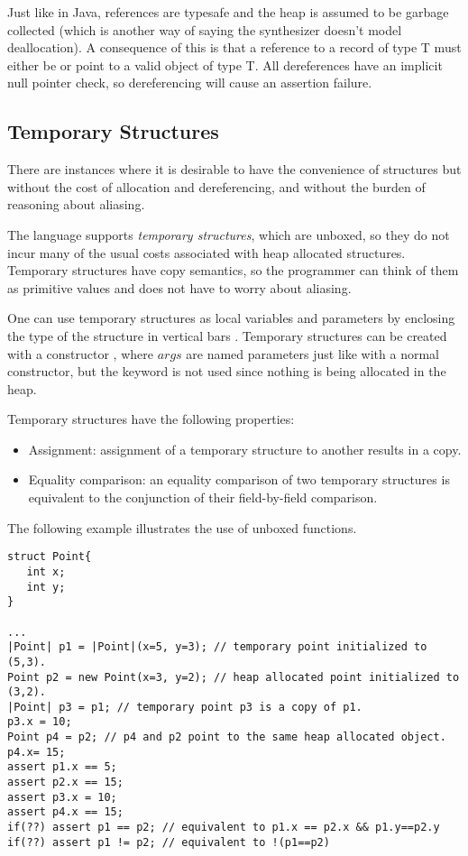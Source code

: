 Just like in Java, references are typesafe and the heap is assumed to be garbage collected (which is another way of saying the synthesizer doesn't model deallocation). A consequence of this is that a reference to a record of type T must either be  or point to a valid object of type T. All dereferences have an implicit null pointer check, so dereferencing  will cause an assertion failure.

\subsection{Temporary Structures}

There are instances where it is desirable to have the convenience of structures but without the cost of allocation and dereferencing, and without the burden of reasoning about aliasing. 

The language supports \emph{temporary structures}, which are unboxed, so they do not incur many of the usual costs associated with heap allocated structures. Temporary structures have copy semantics, so the programmer can think of them as primitive values and does not have to worry about aliasing. 

One can use temporary structures as local variables and parameters by enclosing the type of the structure in vertical bars . Temporary structures can be created with a constructor , where $args$ are named parameters just like with a normal constructor, but the keyword  is not used since nothing is being allocated in the heap. 

Temporary structures have the following properties:
\begin{itemize}
\item Assignment: assignment of a temporary structure to another results in a copy. 
\item Equality comparison: an equality comparison of two temporary structures is equivalent to the conjunction of their field-by-field comparison.
\end{itemize}

The following example illustrates the use of unboxed functions.

\begin{Example}
\begin{lstlisting}
struct Point{
   int x;
   int y;
}

...
|Point| p1 = |Point|(x=5, y=3); // temporary point initialized to (5,3).
Point p2 = new Point(x=3, y=2); // heap allocated point initialized to (3,2).
|Point| p3 = p1; // temporary point p3 is a copy of p1.
p3.x = 10;
Point p4 = p2; // p4 and p2 point to the same heap allocated object.
p4.x= 15;
assert p1.x == 5;
assert p2.x == 15;
assert p3.x = 10;
assert p4.x == 15;
if(??) assert p1 == p2; // equivalent to p1.x == p2.x && p1.y==p2.y
if(??) assert p1 != p2; // equivalent to !(p1==p2)
\end{lstlisting}
\end{Example}


